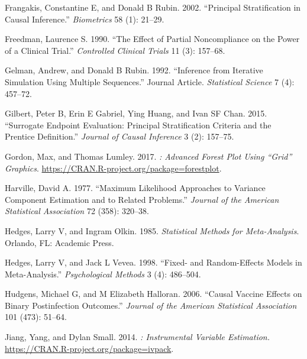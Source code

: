 \begin{CSLReferences}{1}{0}
\leavevmode{}%
Frangakis, Constantine E, and Donald B Rubin. 2002. {``Principal Stratification in Causal Inference.''} \emph{Biometrics} 58 (1): 21--29.

\leavevmode{}%
Freedman, Laurence S. 1990. {``The Effect of Partial Noncompliance on the Power of a Clinical Trial.''} \emph{Controlled Clinical Trials} 11 (3): 157--68.

\leavevmode{}%
Gelman, Andrew, and Donald B Rubin. 1992. {``Inference from Iterative Simulation Using Multiple Sequences.''} Journal Article. \emph{Statistical Science} 7 (4): 457--72.

\leavevmode{}%
Gilbert, Peter B, Erin E Gabriel, Ying Huang, and Ivan SF Chan. 2015. {``Surrogate Endpoint Evaluation: Principal Stratification Criteria and the Prentice Definition.''} \emph{Journal of Causal Inference} 3 (2): 157--75.

\leavevmode{}%
Gordon, Max, and Thomas Lumley. 2017. \emph{: Advanced Forest Plot Using {``Grid''} Graphics}. \url{https://CRAN.R-project.org/package=forestplot}.

\leavevmode{}%
Harville, David A. 1977. {``Maximum Likelihood Approaches to Variance Component Estimation and to Related Problems.''} \emph{Journal of the American Statistical Association} 72 (358): 320--38.

\leavevmode{}%
Hedges, Larry V, and Ingram Olkin. 1985. \emph{Statistical Methods for Meta-Analysis}. Orlando, FL: Academic Press.

\leavevmode{}%
Hedges, Larry V, and Jack L Vevea. 1998. {``Fixed- and Random-Effects Models in Meta-Analysis.''} \emph{Psychological Methods} 3 (4): 486--504.

\leavevmode{}%
Hudgens, Michael G, and M Elizabeth Halloran. 2006. {``Causal Vaccine Effects on Binary Postinfection Outcomes.''} \emph{Journal of the American Statistical Association} 101 (473): 51--64.

\leavevmode{}%
Jiang, Yang, and Dylan Small. 2014. \emph{: Instrumental Variable Estimation.} \url{https://CRAN.R-project.org/package=ivpack}.


\end{CSLReferences}
